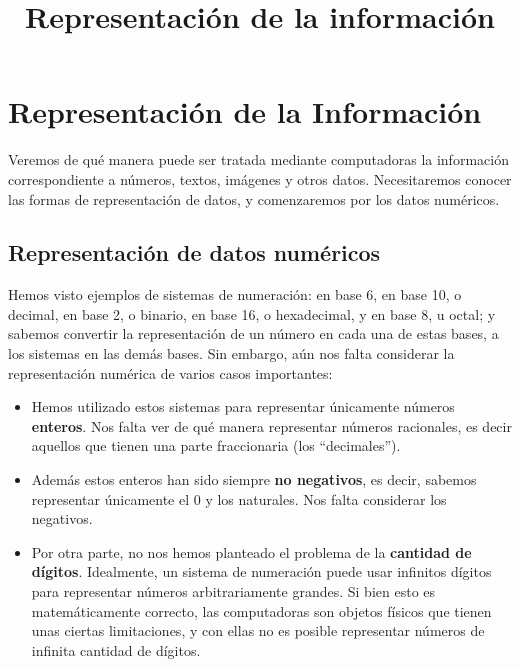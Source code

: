 \documentclass[spanish,a4paper,]{article}
\title{Representación de la información}
\date{}
\providecommand{\tightlist}{%
  \setlength{\itemsep}{0pt}\setlength{\parskip}{0pt}}
\begin{document}
\maketitle

\hypertarget{representaciuxf3n-de-la-informaciuxf3n}{%
\section{Representación de la
Información}\label{representaciuxf3n-de-la-informaciuxf3n}}

Veremos de qué manera puede ser tratada mediante computadoras la
información correspondiente a números, textos, imágenes y otros datos.
Necesitaremos conocer las formas de representación de datos, y
comenzaremos por los datos numéricos.

\hypertarget{representaciuxf3n-de-datos-numuxe9ricos}{%
\subsection{Representación de datos
numéricos}\label{representaciuxf3n-de-datos-numuxe9ricos}}

Hemos visto ejemplos de sistemas de numeración: en base 6, en base 10, o
decimal, en base 2, o binario, en base 16, o hexadecimal, y en base 8, u
octal; y sabemos convertir la representación de un número en cada una de
estas bases, a los sistemas en las demás bases. Sin embargo, aún nos
falta considerar la representación numérica de varios casos importantes:

\begin{itemize}
\tightlist
\item
  Hemos utilizado estos sistemas para representar únicamente números
  \textbf{enteros}. Nos falta ver de qué manera representar números
  racionales, es decir aquellos que tienen una parte fraccionaria (los
  ``decimales'').
\item
  Además estos enteros han sido siempre \textbf{no negativos}, es decir,
  sabemos representar únicamente el 0 y los naturales. Nos falta
  considerar los negativos.
\item
  Por otra parte, no nos hemos planteado el problema de la
  \textbf{cantidad de dígitos}. Idealmente, un sistema de numeración
  puede usar infinitos dígitos para representar números arbitrariamente
  grandes. Si bien esto es matemáticamente correcto, las computadoras
  son objetos físicos que tienen unas ciertas limitaciones, y con ellas
  no es posible representar números de infinita cantidad de dígitos.
\end{itemize}
\end{document}

